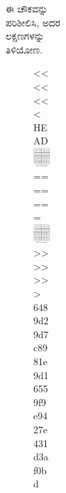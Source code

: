 \begin{figure}[H]
\begin{figure}[H]
\begin{figure}[H]
\begin{figure}[H]
\begin{figure}[H]
ಈ ಚೌಕವನ್ನು ಪರಿಶೀಲಿಸಿ, ಅದರ ಲಕ್ಷಣಗಳನ್ನು ತಿಳಿಯೋಣ.
\begin{figure}[H]
<<<<<<< HEAD
\includegraphics{src/figures/chap4/fig4-21.jpg}
=======
\includegraphics[scale=.78]{src/figures/chap4/fig4.21.jpg}
>>>>>>> 6489d29d7c8981e9d16559f9e9427e431d3af0bd
\end{figure}


\end{figure}
\end{figure}
\end{figure}
\end{figure}
\end{figure}
